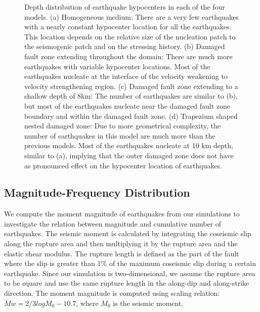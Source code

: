 \documentclass[11pt]{article}
\begin{document}
\begin{figure}[!htb]
{    }
    \caption{Depth distribution of earthquake hypocenters in each of the four models. (a) Homogeneous medium: There are a very few earthquakes with a nearly constant hypocenter location for all the earthquakes. This location depends on the relative size of the nucleation patch to the seismogenic patch and on the stressing history. (b) Damaged fault zone extending throughout the domain: There are much more earthquakes with variable hypocenter locations. Most of the earthquakes nucleate at the interface of the velocity weakening to velocity strengthening region. (c) Damaged fault zone extending to a shallow depth of 8km: The number of earthquakes are similar to (b), but most of the earthquakes nucleate near the damaged fault zone boundary and within the damaged fault zone. (d) Trapezium shaped nested damaged zone: Due to more geometrical complexity, the number of earthquakes in this model are much more than the previous models. Most of the earthquakes nucleate at 10 km depth, similar to (a), implying that the outer damaged zone does not have as pronounced effect on the hypocenter location of earthquakes.}
\end{figure}

\subsection{Magnitude-Frequency Distribution}
We compute the moment magnitude of earthquakes from our simulations to investigate the relation between magnitude and cumulative number of earthquakes. The seismic moment is calculated by integrating the coseismic slip along the rupture area and then multiplying it by the rupture area and the elastic shear modulus. The rupture length is defined as the part of the fault where the slip is greater than 1\% of the maximum coseismic slip during a certain earthquake. Since our simulation is two-dimensional, we assume the rupture area to be square and use the same rupture length in the along-dip and along-strike direction. The moment magnitude is computed using \citet{kanamori_1975} scaling relation: $Mw=2/3 logM_0-10.7$, where $M_0$ is the seismic moment.
\end{document}
